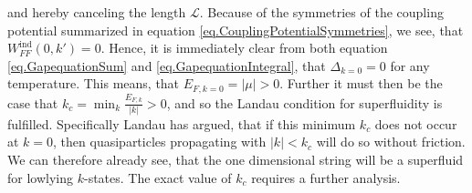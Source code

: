 and hereby canceling the length $\mathcal{L}$. Because of the symmetries of the coupling potential summarized in equation \eqref{eq.CouplingPotentialSymmetries}, we see, that $W^\text{ind}_{FF}(0,k') = 0$. Hence, it is immediately clear from both equation \eqref{eq.GapequationSum} and \eqref{eq.GapequationIntegral}, that $\Delta_{k=0} = 0$ for any temperature. This means, that $E_{F,k=0} = |\mu| > 0$. Further it must then be the case that $k_c = \min_k \frac{E_{F,k}}{|k|} > 0$, and so the Landau condition for superfluidity is fulfilled\cite{LandauStatPhys2,PlischkeStatPhys}.
Specifically Landau has argued, that if this minimum $k_c$ does not occur at $k=0$, then quasiparticles propagating with $|k|< k_c$ will do so without friction. We can therefore already see, that the one dimensional string will be a superfluid for lowlying $k$-states. The exact value of $k_c$ requires a further analysis. 

